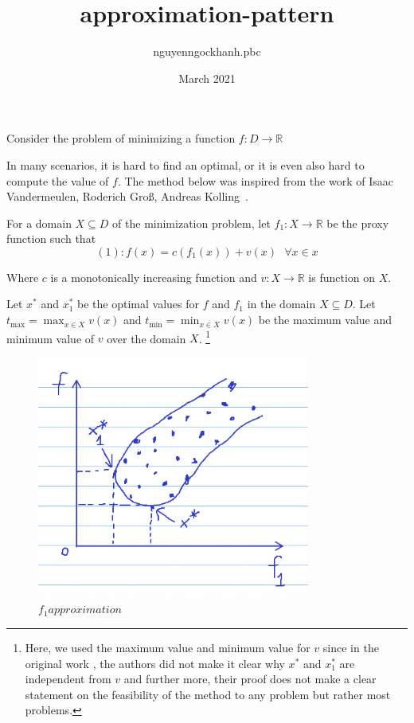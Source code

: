 \documentclass{article}
\title{approximation-pattern}
\author{nguyenngockhanh.pbc }
\date{March 2021}
\begin{document}
\maketitle

Consider the problem of minimizing a function $f: D \to \mathbb{R}$

In many scenarios, it is hard to find an optimal, or it is even also hard to compute the value of $f$.
The method below was inspired from the work of Isaac Vandermeulen, Roderich Groß, Andreas Kolling~\cite{vandermeulen2019balanced}.

For a domain $X \subseteq D$ of the minimization problem,  let $f_1: X \to \mathbb{R}$ be the proxy function such that
\[
    (1): f(x) = c(f_1(x)) + v(x) \text{ } \forall x \in x
\]

Where $c$ is a monotonically increasing function and $v: X \to \mathbb{R}$ is function on $X$.

Let $x^*$ and $x^*_1$ be the optimal values for $f$ and $f_1$ in the domain $X \subseteq D$.
Let $t_{\max} = \max_{x \in X} v(x)$ and $t_{\min} = \min_{x \in X} v(x)$ be the maximum value and minimum value of $v$ over the domain $X$.  \footnote{Here, we used the maximum value and minimum value for $v$ since in the original work \cite{vandermeulen2019balanced}, the authors did not make it clear why $x^*$ and $x^*_1$ are independent from $v$ and further more, their proof does not make a clear statement on the feasibility of the method to any problem but rather most problems.}

\begin{figure}[h!]
\centering
\includegraphics[width=0.8\textwidth]{f1_approximation.png}
\caption{$f_1 approximation$}
\label{fig:f1_approximation}
\end{figure}
\end{document}
